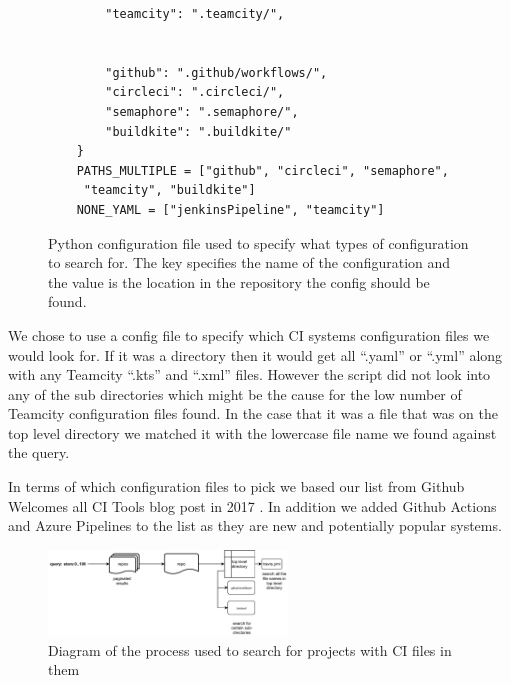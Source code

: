 \documentclass[10pt,conference]{IEEEtran}
\begin{document}
\begin{figure}[!htbp]
\begin{minipage}{.48\textwidth}
\begin{verbatim}
        "teamcity": ".teamcity/",
    
    
        "github": ".github/workflows/",
        "circleci": ".circleci/",
        "semaphore": ".semaphore/",
        "buildkite": ".buildkite/"
    }
    PATHS_MULTIPLE = ["github", "circleci", "semaphore",
     "teamcity", "buildkite"]
    NONE_YAML = ["jenkinsPipeline", "teamcity"]
    \end{verbatim}
    \caption{Python configuration file used to specify what types of configuration to search for. The key specifies the name of the configuration and the value is the location in the repository the config should be found.}
  \end{minipage}
\end{figure}

We chose to use a config file to specify which CI systems configuration files we would look for. If it was a directory then it would get all \enquote{.yaml} or \enquote{.yml} along with any Teamcity \enquote{.kts} and \enquote{.xml} files. However the script did not look into any of the sub directories which might be the cause for the low number of Teamcity configuration files found. In the case that it was a file that was on the top level directory we matched it with the lowercase file name we found against the query.

In terms of which configuration files to pick we based our list from Github Welcomes all CI Tools blog post in 2017 \cite{Github2017}. In addition we added Github Actions and Azure Pipelines to the list as they are new and potentially popular systems. 



\begin{figure}[!t]
  \centering
  \includegraphics[width=2.5in]{methadology diagram.pdf}
  
  \caption[alt text]{Diagram of the process used to search for projects with CI files in them}
  \label{image_methadolgoy_diagram}
\end{figure}
\end{document}
